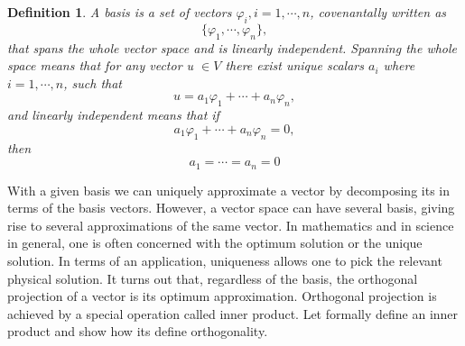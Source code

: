 \documentclass[11pt, oneside]{article}   	%
\newtheorem{definition}{Definition}
\begin{document}
\justify
\begin{definition}
A basis is a set of vectors $\varphi_{i}, i = 1, \cdots, n$, covenantally written as 
\begin{equation}
\{ \varphi_{1}, \cdots, \varphi_{n} \} \nonumber,
\end{equation}
that spans the whole vector space and is linearly independent. Spanning the whole space means that for any vector u $\in V$ there exist unique scalars $a_{i}$ where $i=1,\cdots,n$, such that 
\begin{equation}
u = a_{1}\varphi_{1} + \cdots + a_{n}\varphi_{n} \nonumber,
\end{equation}
and linearly independent means that if
\begin{equation}
a_{1}\varphi_{1} + \cdots + a_{n}\varphi_{n} = 0 \nonumber,
\end{equation}
then 
\begin{equation}
a_{1} = \cdots = a_{n} = 0 \nonumber
\end{equation}
\end{definition}
\justify
With a given basis we can uniquely approximate a vector by decomposing its in terms of the basis vectors. However, a vector space can have several basis, giving rise to several approximations of the same vector. In mathematics and in science in general, one is often concerned with the optimum solution or the unique solution. In terms of an application, uniqueness allows one to pick the relevant physical solution.
It turns out that, regardless of the basis, the orthogonal projection of a vector is its optimum approximation. Orthogonal projection is achieved by a special operation called inner product. Let formally define an inner product and show how its define orthogonality.
\end{document}
